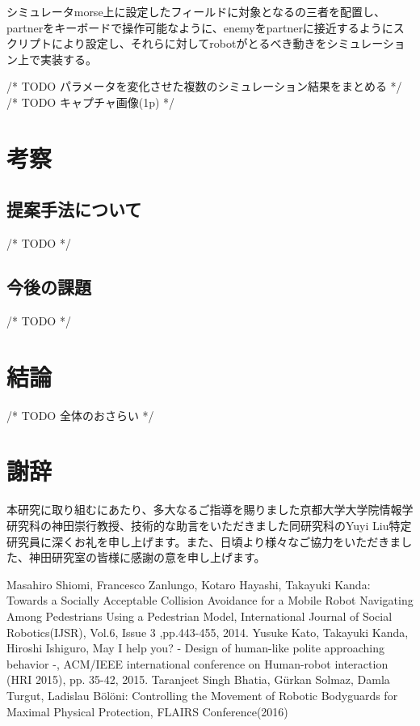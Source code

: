 \documentclass{kuthesis}
\begin{document}
シミュレータmorse上に設定したフィールドに対象となるの三者を配置し、partnerをキーボードで操作可能なように、enemyをpartnerに接近するようにスクリプトにより設定し、それらに対してrobotがとるべき動きをシミュレーション上で実装する。

/* TODO パラメータを変化させた複数のシミュレーション結果をまとめる */
/* TODO キャプチャ画像(1p) */



\section{考察}

\subsection{提案手法について}
/* TODO  */ %

\subsection{今後の課題}
/* TODO */

\section{結論}
/* TODO 全体のおさらい */

\section{謝辞}
本研究に取り組むにあたり、多大なるご指導を賜りました京都大学大学院情報学研究科の神田崇行教授、技術的な助言をいただきました同研究科のYuyi Liu特定研究員に深くお礼を申し上げます。また、日頃より様々なご協力をいただきました、神田研究室の皆様に感謝の意を申し上げます。

\begin{thebibliography}{3}
 Masahiro Shiomi, Francesco Zanlungo, Kotaro Hayashi, Takayuki Kanda: Towards a Socially Acceptable Collision Avoidance for a Mobile Robot Navigating Among Pedestrians Using a Pedestrian Model, International Journal of Social Robotics(IJSR), Vol.6, Issue 3 ,pp.443-455, 2014.
 Yusuke Kato, Takayuki Kanda, Hiroshi Ishiguro, May I help you? - Design of human-like polite approaching behavior -, ACM/IEEE international conference on Human-robot interaction (HRI 2015), pp. 35-42, 2015.
 Taranjeet Singh Bhatia, Gürkan Solmaz, Damla Turgut, Ladislau Bölöni: Controlling the Movement of Robotic Bodyguards for Maximal Physical Protection, FLAIRS Conference(2016)
\end{thebibliography}
\end{document}
